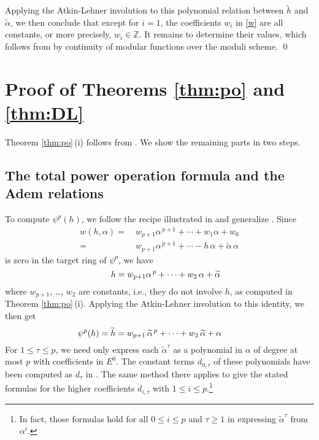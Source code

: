 \documentclass{gtpart}
\theoremstyle{definition}
\theoremstyle{remark}
\newcommand{\mb}[1]{\mathbb{#1}}
\newcommand{\BZ}{{\mb Z}}
\newcommand{\tA}{\widetilde{\A}}
\renewcommand{\th}{\widetilde{h}}
\newcommand{\A}{\alpha}
\newcommand{\T}{\tau}
\renewcommand{\=}{\approx}
\renewcommand{\-}{\sim}
\numberwithin{equation}{section}
\begin{document}
Applying the Atkin-Lehner involution to this polynomial relation between $\th$ 
and $\tA$, we then conclude that except for $i = 1$, the coefficients $w_i$ in 
\eqref{w} are all constants, or more precisely, $w_i \in \BZ$.  It remains to 
determine their values, which follows from \cite[(3.26) and (3.27)]{ho} by 
continuity of modular functions over the moduli scheme.  \qed



\section{Proof of Theorems \ref{thm:po} and \ref{thm:DL}}

Theorem \ref{thm:po}\,(i) follows from \cite[Theorem 1.1]{Str98}.  We show the 
remaining parts in two steps.  

\subsection{The total power operation formula and the Adem relations}

To compute $\psi^p(h)$, we follow the recipe illustrated in 
\cite[Example 3.5]{ho} and generalize \cite[proof of Proposition 6.4]{ho}.  
Since 
\[
 \begin{split}
  w(h,\A) = & ~ w_{p + 1} \A^{\,p + 1} + \cdots + w_1 \A + w_0 \\
          = & ~ w_{p + 1} \A^{\,p + 1} + \cdots - h \, \A + \tA \, \A 
 \end{split}
\]
is zero in the target ring of $\psi^p$, we have 
\[
 \hskip .5cm h = w_{p + 1} \A^{\,p} + \cdots + w_2 \, \A + \tA 
\]
where $w_{p + 1}$, \ldots, $w_2$ are constants, i.e., they do not involve $h$, 
as computed in Theorem \ref{thm:po}\,(i).  Applying the Atkin-Lehner involution 
to this identity, we then get 
\[
 \hskip -.8cm \psi^p(h) = \th = w_{p + 1} \, \tA^{\,p} + \cdots + w_2 \, \tA 
 + \A 
\]
For $1 \leq \T \leq p$, we need only express each $\tA^\T$ as a polynomial in 
$\A$ of degree at most $p$ with coefficients in $E^0$.  The constant terms 
$d_{0,\T}$ of these polynomials have been computed as $d_\T$ in 
\cite[proof of Proposition 6.4]{ho}.  The same method there applies to give the 
stated formulas for the higher coefficients $d_{i,\T}$ with 
$1 \leq i \leq p$.\footnote{In fact, those formulas hold for all 
$0 \leq i \leq p$ and $\T \geq 1$ in expressing $\tA^\T$ from $\A^i$.  }  
\end{document}
